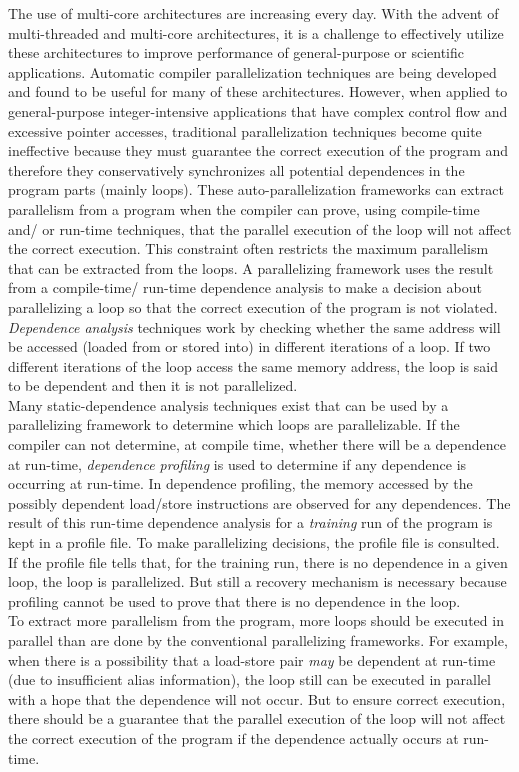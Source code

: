 \documentclass[10pt]{report}          %
\begin{document}
The use of multi-core architectures are increasing every day.  With the advent of multi-threaded and multi-core architectures, it is a challenge to effectively utilize these architectures to improve performance of general-purpose or scientific applications. Automatic compiler parallelization techniques are being developed and found to be useful for many of these architectures.  However, when applied to general-purpose integer-intensive applications that have complex control flow and excessive pointer accesses, traditional parallelization techniques become quite ineffective because they must guarantee the correct execution of the program and therefore they conservatively synchronizes all potential dependences in the program parts (mainly loops).  These auto-parallelization frameworks can extract parallelism from a program when the compiler can prove, using compile-time and/ or run-time techniques, that the parallel execution of the loop will not affect the correct execution.  This constraint often restricts the maximum parallelism that can be extracted from the loops.  A parallelizing framework uses the result from a compile-time/ run-time dependence analysis to make a decision about parallelizing a loop so that the correct execution of the program is not violated.  \textit{Dependence analysis} techniques work by checking whether the same address will be accessed (loaded from or stored into) in different iterations of a loop. If two different iterations of the loop access the same memory address, the loop is said to be dependent and then it is not parallelized.\\
Many static-dependence analysis techniques exist that can be used by a parallelizing framework to determine which loops are parallelizable. If the compiler can not determine, at compile time, whether there will be a dependence at run-time, \textit{dependence profiling} is used to determine if any dependence is occurring at run-time.  In dependence profiling, the memory accessed by the possibly dependent load/store instructions are observed for any dependences.  The result of this run-time dependence analysis for a \textit{training} run of the program is kept in a profile file.  To make parallelizing decisions, the profile file is consulted.  If the profile file tells that, for the training run, there is no dependence in a given loop, the loop is parallelized. But still a recovery mechanism is necessary because profiling cannot be used to prove that there is no dependence in the loop.\\
To extract more parallelism from the program, more loops should be executed in parallel than are done by the conventional parallelizing frameworks.  For example, when there is a possibility that a load-store pair \textit{may} be dependent at run-time (due to insufficient alias information), the loop still can be executed in parallel with a hope that the dependence will not occur.  But to ensure correct execution, there should be a guarantee that the parallel execution of the loop will not affect the correct execution of the program if the dependence actually occurs at run-time.\\
\end{document}
